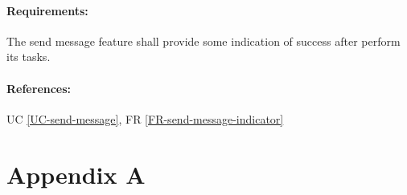 \documentclass[11pt]{article}
\begin{document}
\paragraph{Requirements:} The send message feature shall provide some indication of success after perform its tasks.
\paragraph{References:} UC \ref{UC-send-message}, FR \ref{FR-send-message-indicator}


\newpage
\section{Appendix A} \label{appendix-a}
\listoffigures
\end{document}
